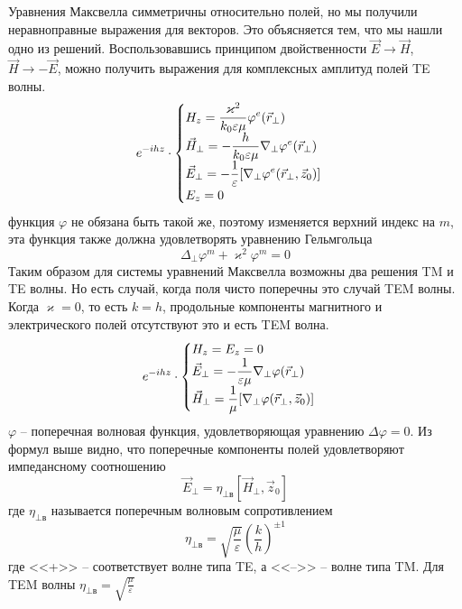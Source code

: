 \documentclass[a4paper,14pt]{extarticle}
\renewcommand{\phi}{\varphi}
\renewcommand{\epsilon}{\varepsilon}
\renewcommand{\kappa}{\varkappa}
\newcommand{\ticket}[1] {
\newpage
\hypertarget{num#1}{}
\begin{center}
	\textbf{Вопрос минимума №#1 }
\end{center}
}
\begin{document}
	Уравнения Максвелла симметричны относительно полей, но мы получили неравноправные выражения для векторов. Это объясняется тем, что мы нашли одно из решений. Воспользовавшись принципом двойственности $\vec{E}\to\vec{H}$, $\vec{H}\to -\vec{E}$, можно получить выражения  для комплексных амплитуд полей TE волны. 
	\begin{displaymath}
	e^{-ihz}\cdot
	\begin{cases}
	$$\displaystyle H_z = \frac{\kappa^2}{k_0\epsilon\mu}\phi^e(\vec{r}_\perp)$$ \\
	$$\displaystyle\vec{H}_\perp = -\frac{h}{k_0\epsilon\mu}\nabla_\perp\phi^e(\vec{r}_\perp)$$ \\
	$$\displaystyle\vec{E}_\perp = -\frac{1}{\epsilon}[\nabla_\perp\phi^e(\vec{r}_\perp,\vec{z}_0)]$$ \\
	$$\displaystyle E_z = 0$$
	\end{cases}
	\end{displaymath}
	функция $\phi$ не обязана быть такой же, поэтому изменяется верхний индекс на $m$, эта функция также должна удовлетворять уравнению Гельмгольца  
	$$\Delta_\perp\phi^{m} + \kappa^2\phi^{m}=0$$
	Таким образом для системы уравнений Максвелла возможны два решения TM и TE волны. Но есть случай, когда поля чисто поперечны это случай TEM волны.
	Когда $\kappa = 0$, то есть $k=h$, продольные компоненты магнитного и электрического полей отсутствуют это и есть TEM волна.
	\begin{displaymath}
	e^{-ihz}\cdot
	\begin{cases}
	$$\displaystyle H_z = E_z = 0$$ \\
	$$\displaystyle\vec{E}_\perp = -\frac{1}{\epsilon\mu}\nabla_\perp\phi(\vec{r}_\perp)$$ \\
	$$\displaystyle\vec{H}_\perp = \frac{1}{\mu}[\nabla_\perp\phi(\vec{r}_\perp,\vec{z}_0)]$$ 
	\end{cases}
	\end{displaymath}
	$\phi$ -- поперечная волновая функция, удовлетворяющая уравнению $\Delta\phi=0$.
	Из формул выше видно, что поперечные компоненты полей удовлетворяют импедансному соотношению
	$$\vec{E}_\perp = \eta_{\perp\text{в}}[\vec{H}_\perp,\vec{z}_0]$$
	где $\eta_{\perp\text{в}}$ называется поперечным волновым сопротивлением
	$$\eta_{\perp\text{в}}=\sqrt{\frac{\mu}{\epsilon}} \left( \frac{k}{h} \right)^{\pm 1}$$ 
	где <<+>> -- соответствует волне типа TE, а <<-->> -- волне типа TM. Для TEM волны $\displaystyle \eta_{\perp\text{в}}=\sqrt{\frac{\mu}{\epsilon}}$
	
	
\end{document}
